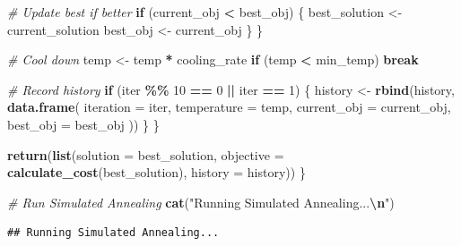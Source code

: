 \documentclass[
]{article}
\newenvironment{Shaded}{\begin{snugshade}}{\end{snugshade}}
\newcommand{\AttributeTok}[1]{\textcolor[rgb]{0.13,0.29,0.53}{#1}}
\newcommand{\CommentTok}[1]{\textcolor[rgb]{0.56,0.35,0.01}{\textit{#1}}}
\newcommand{\ControlFlowTok}[1]{\textcolor[rgb]{0.13,0.29,0.53}{\textbf{#1}}}
\newcommand{\DecValTok}[1]{\textcolor[rgb]{0.00,0.00,0.81}{#1}}
\newcommand{\FunctionTok}[1]{\textcolor[rgb]{0.13,0.29,0.53}{\textbf{#1}}}
\newcommand{\NormalTok}[1]{#1}
\newcommand{\OtherTok}[1]{\textcolor[rgb]{0.56,0.35,0.01}{#1}}
\newcommand{\SpecialCharTok}[1]{\textcolor[rgb]{0.81,0.36,0.00}{\textbf{#1}}}
\newcommand{\StringTok}[1]{\textcolor[rgb]{0.31,0.60,0.02}{#1}}
\begin{document}
\begin{Shaded}
\begin{Highlighting}[]
      \CommentTok{\# Update best if better}
      \ControlFlowTok{if}\NormalTok{ (current\_obj }\SpecialCharTok{\textless{}}\NormalTok{ best\_obj) \{}
\NormalTok{        best\_solution }\OtherTok{\textless{}{-}}\NormalTok{ current\_solution}
\NormalTok{        best\_obj }\OtherTok{\textless{}{-}}\NormalTok{ current\_obj}
\NormalTok{      \}}
\NormalTok{    \}}
    
    \CommentTok{\# Cool down}
\NormalTok{    temp }\OtherTok{\textless{}{-}}\NormalTok{ temp }\SpecialCharTok{*}\NormalTok{ cooling\_rate}
    \ControlFlowTok{if}\NormalTok{ (temp }\SpecialCharTok{\textless{}}\NormalTok{ min\_temp) }\ControlFlowTok{break}
    
    \CommentTok{\# Record history}
    \ControlFlowTok{if}\NormalTok{ (iter }\SpecialCharTok{\%\%} \DecValTok{10} \SpecialCharTok{==} \DecValTok{0} \SpecialCharTok{||}\NormalTok{ iter }\SpecialCharTok{==} \DecValTok{1}\NormalTok{) \{}
\NormalTok{      history }\OtherTok{\textless{}{-}} \FunctionTok{rbind}\NormalTok{(history, }\FunctionTok{data.frame}\NormalTok{(}
        \AttributeTok{iteration =}\NormalTok{ iter,}
        \AttributeTok{temperature =}\NormalTok{ temp,}
        \AttributeTok{current\_obj =}\NormalTok{ current\_obj,}
        \AttributeTok{best\_obj =}\NormalTok{ best\_obj}
\NormalTok{      ))}
\NormalTok{    \}}
\NormalTok{  \}}
  
  \FunctionTok{return}\NormalTok{(}\FunctionTok{list}\NormalTok{(}\AttributeTok{solution =}\NormalTok{ best\_solution, }
              \AttributeTok{objective =} \FunctionTok{calculate\_cost}\NormalTok{(best\_solution),}
              \AttributeTok{history =}\NormalTok{ history))}
\NormalTok{\}}

\CommentTok{\# Run Simulated Annealing}
\FunctionTok{cat}\NormalTok{(}\StringTok{"Running Simulated Annealing...}\SpecialCharTok{\textbackslash{}n}\StringTok{"}\NormalTok{)}
\end{Highlighting}
\end{Shaded}

\begin{verbatim}
## Running Simulated Annealing...
\end{verbatim}
\end{document}
